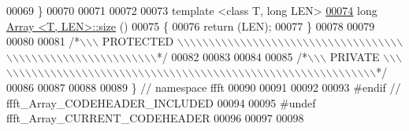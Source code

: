 \begin{DoxyCode}
00069 \}
00070 
00071 
00072 
00073 \textcolor{keyword}{template} <\textcolor{keyword}{class} T, \textcolor{keywordtype}{long} LEN>
\hypertarget{a00084_source_l00074}{}\hyperlink{a00003_ab8bcd460790868c4d3aa7e9706d8a0b2}{00074} \textcolor{keywordtype}{long}    \hyperlink{a00003}{Array <T, LEN>::size} ()
00075 \{
00076     \textcolor{keywordflow}{return} (LEN);
00077 \}
00078 
00079 
00080 
00081 \textcolor{comment}{/*\(\backslash\)\(\backslash\)\(\backslash\) PROTECTED \(\backslash\)\(\backslash\)\(\backslash\)\(\backslash\)\(\backslash\)\(\backslash\)\(\backslash\)\(\backslash\)\(\backslash\)\(\backslash\)\(\backslash\)\(\backslash\)\(\backslash\)\(\backslash\)\(\backslash\)\(\backslash\)\(\backslash\)\(\backslash\)\(\backslash\)\(\backslash\)\(\backslash\)\(\backslash\)\(\backslash\)\(\backslash\)\(\backslash\)\(\backslash\)\(\backslash\)\(\backslash\)\(\backslash\)\(\backslash\)\(\backslash\)\(\backslash\)\(\backslash\)\(\backslash\)\(\backslash\)\(\backslash\)\(\backslash\)\(\backslash\)\(\backslash\)\(\backslash\)\(\backslash\)\(\backslash\)\(\backslash\)\(\backslash\)\(\backslash\)\(\backslash\)\(\backslash\)\(\backslash\)\(\backslash\)\(\backslash\)\(\backslash\)\(\backslash\)\(\backslash\)\(\backslash\)\(\backslash\)\(\backslash\)\(\backslash\)\(\backslash\)\(\backslash\)\(\backslash\)*/}
00082 
00083 
00084 
00085 \textcolor{comment}{/*\(\backslash\)\(\backslash\)\(\backslash\) PRIVATE \(\backslash\)\(\backslash\)\(\backslash\)\(\backslash\)\(\backslash\)\(\backslash\)\(\backslash\)\(\backslash\)\(\backslash\)\(\backslash\)\(\backslash\)\(\backslash\)\(\backslash\)\(\backslash\)\(\backslash\)\(\backslash\)\(\backslash\)\(\backslash\)\(\backslash\)\(\backslash\)\(\backslash\)\(\backslash\)\(\backslash\)\(\backslash\)\(\backslash\)\(\backslash\)\(\backslash\)\(\backslash\)\(\backslash\)\(\backslash\)\(\backslash\)\(\backslash\)\(\backslash\)\(\backslash\)\(\backslash\)\(\backslash\)\(\backslash\)\(\backslash\)\(\backslash\)\(\backslash\)\(\backslash\)\(\backslash\)\(\backslash\)\(\backslash\)\(\backslash\)\(\backslash\)\(\backslash\)\(\backslash\)\(\backslash\)\(\backslash\)\(\backslash\)\(\backslash\)\(\backslash\)\(\backslash\)\(\backslash\)\(\backslash\)\(\backslash\)\(\backslash\)\(\backslash\)\(\backslash\)\(\backslash\)\(\backslash\)*/}
00086 
00087 
00088 
00089 \}   \textcolor{comment}{// namespace ffft}
00090 
00091 
00092 
00093 \textcolor{preprocessor}{#endif  // ffft\_Array\_CODEHEADER\_INCLUDED}
00094 
00095 \textcolor{preprocessor}{#undef ffft\_Array\_CURRENT\_CODEHEADER}
00096 
00097 
00098 

\end{DoxyCode}
